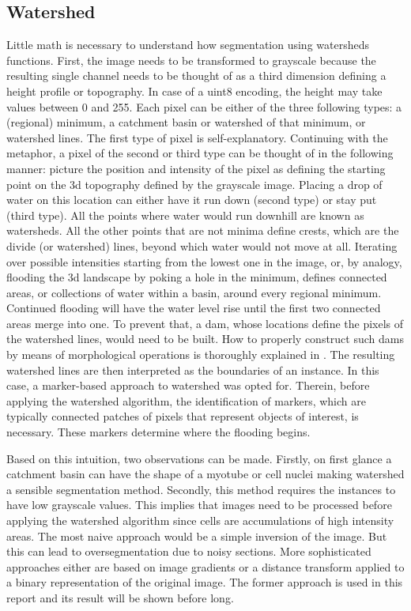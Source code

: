 \subsection{Watershed}
Little math is necessary to understand how segmentation using watersheds functions. First, the image needs to be transformed to grayscale because the resulting single channel needs to be thought of as a third dimension defining a height profile or topography. In case of a uint8 encoding, the height may take values between 0 and 255. Each pixel can be either of the three following types: a (regional) minimum, a catchment basin or watershed of that minimum, or watershed lines. The first type of pixel is self-explanatory. Continuing with the metaphor, a pixel of the second or third type can be thought of in the following manner: picture the position and intensity of the pixel as defining the starting point on the 3d topography defined by the grayscale image. Placing a drop of water on this location can either have it run down (second type) or stay put (third type). All the points where water would run downhill are known as watersheds. All the other points that are not minima define crests, which are the divide (or watershed) lines, beyond which water would not move at all. Iterating over possible intensities starting from the lowest one in the image, or, by analogy, flooding the 3d landscape by poking a hole in the minimum, defines connected areas, or collections of water within a basin, around every regional minimum. Continued flooding will have the water level rise until the first two connected areas merge into one. To prevent that, a dam, whose locations define the pixels of the watershed lines, would need to be built. How to properly construct such dams by means of morphological operations \cite{serra} is thoroughly explained in \cite{Gonzalez1992, coupriewatershed}. The resulting watershed lines are then interpreted as the boundaries of an instance. In this case, a marker-based approach to watershed \cite{meyer} was opted for. Therein, before applying the watershed algorithm, the identification of markers, which are typically connected patches of pixels that represent objects of interest, is necessary. These markers determine where the flooding begins. 

Based on this intuition, two observations can be made. Firstly, on first glance a catchment basin can have the shape of a myotube or cell nuclei making watershed a sensible segmentation method. Secondly, this method requires the instances to have low grayscale values. This implies that images need to be processed before applying the watershed algorithm since cells are accumulations of high intensity areas. The most naive approach would be a simple inversion of the image. But this can lead to oversegmentation due to noisy sections. More sophisticated approaches either are based on image gradients or a distance transform applied to a binary representation of the original image. The former approach is used in this report and its result will be shown before long.


